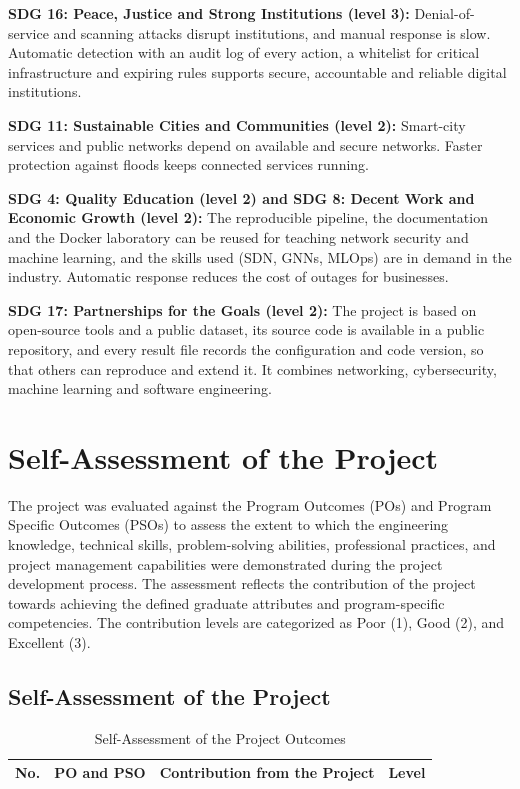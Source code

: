 \begin{appendices}
\textbf{SDG 16: Peace, Justice and Strong Institutions (level 3):}
Denial-of-service and scanning attacks disrupt institutions, and manual response is slow. Automatic detection with an audit log of every action, a whitelist for critical infrastructure and expiring rules supports secure, accountable and reliable digital institutions.

\textbf{SDG 11: Sustainable Cities and Communities (level 2):}
Smart-city services and public networks depend on available and secure networks. Faster protection against floods keeps connected services running.

\textbf{SDG 4: Quality Education (level 2) and SDG 8: Decent Work and Economic Growth (level 2):}
The reproducible pipeline, the documentation and the Docker laboratory can be reused for teaching network security and machine learning, and the skills used (SDN, GNNs, MLOps) are in demand in the industry. Automatic response reduces the cost of outages for businesses.

\textbf{SDG 17: Partnerships for the Goals (level 2):}
The project is based on open-source tools and a public dataset, its source code is available in a public repository, and every result file records the configuration and code version, so that others can reproduce and extend it. It combines networking, cybersecurity, machine learning and software engineering.

\chapter{Self-Assessment of the Project}
The project was evaluated against the Program Outcomes (POs) and Program Specific Outcomes (PSOs) to assess the extent to which the engineering knowledge, technical skills, problem-solving abilities, professional practices, and project management capabilities were demonstrated during the project development process. The assessment reflects the contribution of the project towards achieving the defined graduate attributes and program-specific competencies. The contribution levels are categorized as Poor (1), Good (2), and Excellent (3).

\section{Self-Assessment of the Project}

\begin{longtable}{|c|p{5.2cm}|p{7cm}|c|}
	\caption{Self-Assessment of the Project Outcomes}
	\label{tab:self-assessment}\\
	\hline
	\textbf{No.} & \textbf{PO and PSO} & \textbf{Contribution from the Project} & \textbf{Level} \\
	\hline
	\endfirsthead


\end{longtable}
\end{appendices}
